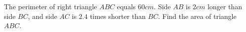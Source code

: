 The perimeter of right triangle $ABC$ equals $60cm$. Side $AB$ is $2cm$ longer than side $BC$, and side $AC$ is $2.4$ times shorter than $BC$. Find the area of triangle $ABC$.
